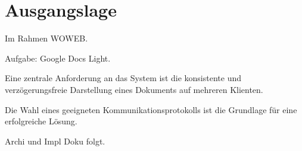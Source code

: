 \section{Ausgangslage}

Im Rahmen WOWEB.

Aufgabe: Google Docs Light.

Eine zentrale Anforderung an das System ist die konsistente und verzögerungsfreie Darstellung eines Dokuments auf mehreren Klienten.

Die Wahl eines geeigneten Kommunikationsprotokolls ist die Grundlage für eine erfolgreiche Lösung.

Archi und Impl Doku folgt.
